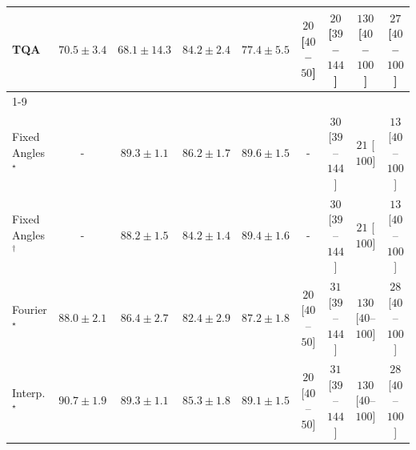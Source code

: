 \begin{tabular}{l|cccc|cccc|}
TQA & {\cellcolor[HTML]{FEA736}} \color[HTML]{000000} $70.5\pm 3.4$ & {\cellcolor[HTML]{FEBA46}} \color[HTML]{000000} $68.1\pm 14.3$ & {\cellcolor[HTML]{BE4503}} \color[HTML]{F1F1F1} $84.2\pm 2.4$ & {\cellcolor[HTML]{EC7014}} \color[HTML]{F1F1F1} $77.4\pm 5.5$ & {\cellcolor[HTML]{FFF4F0}} \color[HTML]{000000} $20$ [$40$--$50$] & {\cellcolor[HTML]{FFF4F0}} \color[HTML]{000000} $20$ [$39$--$144$] & {\cellcolor[HTML]{FDDBD7}} \color[HTML]{000000} $130$ [$40$--$100$] & {\cellcolor[HTML]{FFF3EF}} \color[HTML]{000000} $27$ [$40$--$100$] \\
\cline{1-9}
\multicolumn{9}{c}{\rule{0pt}{8pt}PP} \\
\midrule
Fixed Angles$^\star$ & {\cellcolor[HTML]{000000}} \color[HTML]{F1F1F1} {\cellcolor{white}} \color{black} - & {\cellcolor[HTML]{005F34}} \color[HTML]{F1F1F1} $89.3\pm 1.1$ & {\cellcolor[HTML]{0C723B}} \color[HTML]{F1F1F1} $86.2\pm 1.7$ & {\cellcolor[HTML]{005D33}} \color[HTML]{F1F1F1} $89.6\pm 1.5$ & {\cellcolor[HTML]{000000}} \color[HTML]{F1F1F1} {\cellcolor{white}} \color{black} - & {\cellcolor[HTML]{FFF2EE}} \color[HTML]{000000} $30$ [$39$--$144$] & {\cellcolor[HTML]{FFF4F0}} \color[HTML]{000000} $21$ [$100$] & {\cellcolor[HTML]{FFF6F2}} \color[HTML]{000000} $13$ [$40$--$100$] \\
Fixed Angles$^\dagger$ & {\cellcolor[HTML]{000000}} \color[HTML]{F1F1F1} {\cellcolor{white}} \color{black} - & {\cellcolor[HTML]{006737}} \color[HTML]{F1F1F1} $88.2\pm 1.5$ & {\cellcolor[HTML]{197C40}} \color[HTML]{F1F1F1} $84.2\pm 1.4$ & {\cellcolor[HTML]{005F34}} \color[HTML]{F1F1F1} $89.4\pm 1.6$ & {\cellcolor[HTML]{000000}} \color[HTML]{F1F1F1} {\cellcolor{white}} \color{black} - & {\cellcolor[HTML]{FFF2EE}} \color[HTML]{000000} $30$ [$39$--$144$] & {\cellcolor[HTML]{FFF4F0}} \color[HTML]{000000} $21$ [$100$] & {\cellcolor[HTML]{FFF6F2}} \color[HTML]{000000} $13$ [$40$--$100$] \\
Fourier$^\star$ & {\cellcolor[HTML]{006837}} \color[HTML]{F1F1F1} $88.0\pm 2.1$ & {\cellcolor[HTML]{0B713B}} \color[HTML]{F1F1F1} $86.4\pm 2.7$ & {\cellcolor[HTML]{258745}} \color[HTML]{F1F1F1} $82.4\pm 2.9$ & {\cellcolor[HTML]{066D39}} \color[HTML]{F1F1F1} $87.2\pm 1.8$ & {\cellcolor[HTML]{FFF4F0}} \color[HTML]{000000} $20$ [$40$--$50$] & {\cellcolor[HTML]{FFF2EE}} \color[HTML]{000000} $31$ [$39$--$144$] & {\cellcolor[HTML]{FDDBD7}} \color[HTML]{000000} $130$ [$40$--$100$] & {\cellcolor[HTML]{FFF3EF}} \color[HTML]{000000} $28$ [$40$--$100$] \\
Interp.$^\star$ & {\cellcolor[HTML]{005730}} \color[HTML]{F1F1F1} $90.7\pm 1.9$ & {\cellcolor[HTML]{005F34}} \color[HTML]{F1F1F1} $89.3\pm 1.1$ & {\cellcolor[HTML]{12763D}} \color[HTML]{F1F1F1} $85.3\pm 1.8$ & {\cellcolor[HTML]{006034}} \color[HTML]{F1F1F1} $89.1\pm 1.5$ & {\cellcolor[HTML]{FFF4F0}} \color[HTML]{000000} $20$ [$40$--$50$] & {\cellcolor[HTML]{FFF2EE}} \color[HTML]{000000} $31$ [$39$--$144$] & {\cellcolor[HTML]{FDDBD7}} \color[HTML]{000000} $130$ [$40$--$100$] & {\cellcolor[HTML]{FFF3EF}} \color[HTML]{000000} $28$ [$40$--$100$] \\

\end{tabular}
